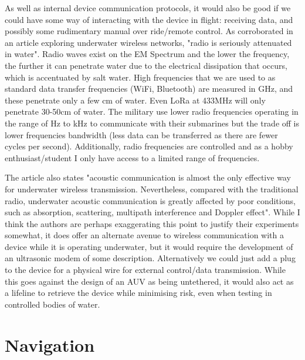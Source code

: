 \documentclass[11pt,a4paper,titlepage]{report}
\begin{document}
	As well as internal device communication protocols, it would also be good if we could have some way of interacting with the device in flight: receiving data, and possibly some rudimentary manual over ride/remote control. As corroborated in an article exploring underwater wireless networks, "radio is seriously attenuated in water"\cite{UNDERWATER_RADIO}. Radio waves exist on the EM Spectrum and the lower the frequency, the further it can penetrate water due to the electrical dissipation that occurs, which is accentuated by salt water. High frequencies that we are used to as standard data transfer frequencies (WiFi, Bluetooth) are measured in \unit{\giga\hertz}, and these penetrate only a few \unit{\centi\meter} of water. Even LoRa at 433\unit{\mega\hertz} will only penetrate 30-50\unit{\centi\meter} of water. The military use lower radio frequencies operating in the range of \unit{\hertz} to \unit{\kilo\hertz} to communicate with their submarines but the trade off is lower frequencies bandwidth (less data can be transferred as there are fewer cycles per second). Additionally, radio frequencies are controlled\cite{RADIO_FREQ_TABLE} and as a hobby enthusiast/student I only have access to a limited range of frequencies.  
	
	The article also states "acoustic communication is almost the only effective way for underwater wireless transmission. Nevertheless, compared with the traditional radio, underwater acoustic communication is greatly affected by poor conditions, such as absorption, scattering, multipath interference and Doppler effect"\cite{UNDERWATER_RADIO}. While I think the authors are perhaps exaggerating this point to justify their experiments somewhat, it does offer an alternate avenue to wireless communication with a device while it is operating underwater, but it would require the development of an ultrasonic modem of some description. Alternatively we could just add a plug to the device for a physical wire for external control/data transmission. While this goes against the design of an AUV as being untethered, it would also act as a lifeline to retrieve the device while minimising risk, even when testing in controlled bodies of water. 
	
	\section*{Navigation}
	
\end{document}
